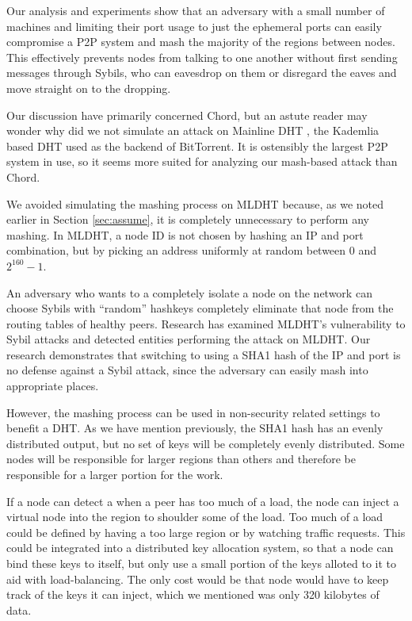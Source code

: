 \documentclass[11pt,conference]{IEEEtran}
\begin{document}
Our analysis and experiments show that an adversary with a small number of machines and limiting their port usage to just the ephemeral ports can easily compromise a P2P system and mash the majority of the regions between nodes.
This effectively prevents nodes from talking to one another without first sending messages through Sybils, who can eavesdrop on them or disregard the eaves and move straight on to the dropping.

Our discussion have primarily concerned Chord, but an astute reader may wonder why did we not simulate an attack on Mainline DHT  \cite{mainline}, the Kademlia \cite{kademlia} based DHT used as the backend of BitTorrent.
It is ostensibly the largest P2P system in use, so it seems more suited for analyzing our mash-based attack than Chord.

We avoided simulating the mashing process on MLDHT because, as we noted earlier in Section \ref{sec:assume}, it is completely unnecessary to perform any mashing.
In MLDHT, a node ID is not chosen by hashing an IP and port combination, but by picking an address uniformly at random between 0 and $2^{160}-1$.

An adversary who wants to a completely isolate a node on the network can choose Sybils with ``random'' hashkeys completely eliminate that node from the routing tables of healthy peers. 
Research has examined MLDHT's vulnerability to Sybil attacks \cite{sybilbit} and detected entities performing the attack on MLDHT.
Our research demonstrates that switching to using a SHA1 hash of the IP and port is no defense against a Sybil attack, since the adversary can easily mash into appropriate places.



However, the mashing process can be used in non-security related settings to benefit a DHT.
As we have mention previously, the SHA1 hash has an evenly distributed output, but no set of keys will be completely evenly distributed.
Some nodes will be responsible for larger regions than others and therefore be responsible for a larger portion for the work.

If a node can detect a when a peer has too much of a load, the node can inject a virtual node into the region to shoulder some of the load.
Too much of a load could be defined by having a too large region or by watching traffic requests.
This could be integrated into a distributed key allocation system, so that a node can bind these keys to itself, but only use a small portion of the keys alloted to it to aid with load-balancing.
The only cost would be that node would have to keep track of the keys it can inject, which we mentioned was only 320 kilobytes of data.



\end{document}

